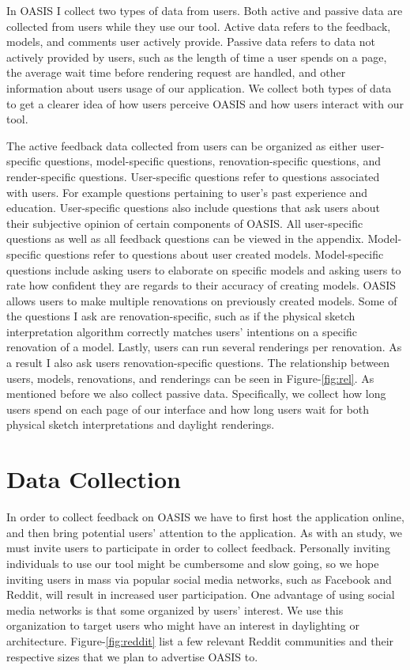 	In OASIS I collect two types of data from users.
	Both active and passive data are collected from users while they use our tool.
	Active data refers to the feedback, models, and comments user actively provide.
	Passive data refers to data not actively provided by users, such as the length of time a user spends on a page, the average wait time before rendering request are handled, and other information about users usage of our application. We collect both types of data to get a clearer idea of how users perceive OASIS and how users interact with our tool.

	The active feedback data collected from users can be organized as either user-specific questions, model-specific questions, renovation-specific questions, and render-specific questions.
	User-specific questions refer to questions associated with users.
	For example questions pertaining to user's past experience and education.
	User-specific questions also include questions that ask users about their subjective opinion of certain components of OASIS.
	All user-specific questions as well as all feedback questions can be viewed in the appendix. 
	Model-specific questions refer to questions about user created models.
	Model-specific questions include asking users to elaborate on specific models and asking users to rate how confident they are regards to their accuracy of creating models.
	OASIS allows users to make multiple renovations on previously created models.
	Some of the questions I ask are renovation-specific, such as if the physical sketch interpretation algorithm correctly matches users' intentions on a specific renovation of a model.
	Lastly, users can run several renderings per renovation.
	As a result I also ask users renovation-specific questions.
	The relationship between users, models, renovations, and renderings can be seen in Figure-\ref{fig:rel}.
	As mentioned before we also collect passive data.
	Specifically, we collect how long users spend on each page of our interface and how long users wait for both physical sketch interpretations and daylight renderings.



\section{Data Collection}
	In order to collect feedback on OASIS we have to first host the application online, and then bring potential users' attention to the application.
	As with an study, we must invite users to participate in order to collect feedback.
	Personally inviting individuals to use our tool might be cumbersome and slow going, so we hope inviting users in mass via popular social media networks, such as Facebook and Reddit, will result in increased user participation.
	One advantage of using social media networks is that some organized by users' interest. 
	We use this organization to target users who might have an interest in daylighting or architecture.
	Figure-\ref{fig:reddit} list a few relevant Reddit communities and their respective sizes that we plan to advertise OASIS to.

